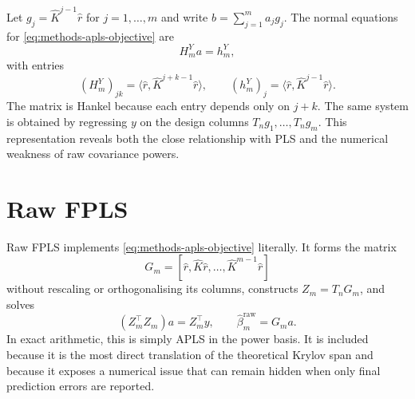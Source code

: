 Let $g_j=\widehat K^{j-1}\widehat r$ for $j=1,\ldots,m$ and write
$b=\sum_{j=1}^{m}a_jg_j$.  The normal equations for
\eqref{eq:methods-apls-objective} are
\begin{equation}
    H_m^{Y}a=h_m^{Y},
    \label{eq:methods-response-hankel-system}
\end{equation}
with entries
\begin{equation}
    (H_m^{Y})_{jk}
    =\langle\widehat r,
      \widehat K^{j+k-1}\widehat r\rangle,
    \qquad
    (h_m^{Y})_j
    =\langle\widehat r,
      \widehat K^{j-1}\widehat r\rangle.
    \label{eq:methods-response-hankel-entries}
\end{equation}
The matrix is Hankel because each entry depends only on $j+k$.  The same
system is obtained by regressing $y$ on the design columns
$T_ng_1,\ldots,T_ng_m$.  This representation reveals both the close
relationship with PLS and the numerical weakness of raw covariance powers.

\section{Raw FPLS}
\label{sec:methods-raw-fpls}

Raw FPLS implements \eqref{eq:methods-apls-objective} literally.  It forms
the matrix
\begin{equation}
    G_m=
    [\widehat r,\widehat K\widehat r,\ldots,
      \widehat K^{m-1}\widehat r]
    \label{eq:methods-raw-krylov-matrix}
\end{equation}
without rescaling or orthogonalising its columns, constructs
$Z_m=T_nG_m$, and solves
\begin{equation}
    (Z_m^\top Z_m)a=Z_m^\top y,
    \qquad
    \widehat\beta_m^{\mathrm{raw}}=G_ma.
    \label{eq:methods-raw-normal-equations}
\end{equation}
In exact arithmetic, this is simply APLS in the power basis.  It is included
because it is the most direct translation of the theoretical Krylov span and
because it exposes a numerical issue that can remain hidden when only final
prediction errors are reported.

